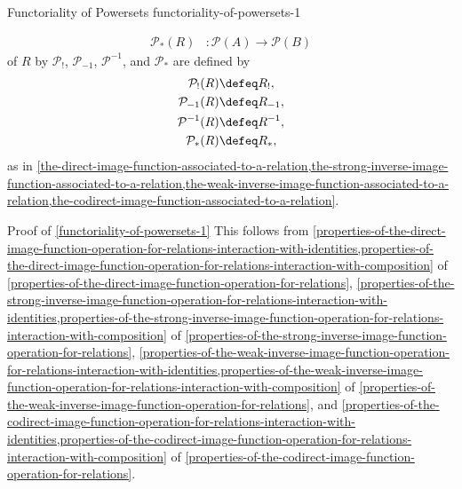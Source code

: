 \begin{proposition}{Functoriality of Powersets \rmI}{functoriality-of-powersets-1}
\begin{itemize}
\begin{align*}
                \mathcal{P}_{*}(R)  &\colon \mathcal{P}(A) \to \mathcal{P}(B)%
            \end{align*}
            of $R$ by $\mathcal{P}_{!}$, $\mathcal{P}_{-1}$, $\mathcal{P}^{-1}$, and $\mathcal{P}_{*}$ are defined by
            \begin{align*}
                \mathcal{P}_{!}(R)  &\defeq R_{!},\\%
                \mathcal{P}_{-1}(R) &\defeq R_{-1},\\%
                \mathcal{P}^{-1}(R) &\defeq R^{-1},\\%
                \mathcal{P}_{*}(R)  &\defeq R_{*},%
            \end{align*}
            as in \cref{the-direct-image-function-associated-to-a-relation,the-strong-inverse-image-function-associated-to-a-relation,the-weak-inverse-image-function-associated-to-a-relation,the-codirect-image-function-associated-to-a-relation}.
    \end{itemize}
\end{proposition}
\begin{Proof}{Proof of \cref{functoriality-of-powersets-1}}%
    This follows from \cref{properties-of-the-direct-image-function-operation-for-relations-interaction-with-identities,properties-of-the-direct-image-function-operation-for-relations-interaction-with-composition} of \cref{properties-of-the-direct-image-function-operation-for-relations}, \cref{properties-of-the-strong-inverse-image-function-operation-for-relations-interaction-with-identities,properties-of-the-strong-inverse-image-function-operation-for-relations-interaction-with-composition} of \cref{properties-of-the-strong-inverse-image-function-operation-for-relations}, \cref{properties-of-the-weak-inverse-image-function-operation-for-relations-interaction-with-identities,properties-of-the-weak-inverse-image-function-operation-for-relations-interaction-with-composition} of \cref{properties-of-the-weak-inverse-image-function-operation-for-relations}, and \cref{properties-of-the-codirect-image-function-operation-for-relations-interaction-with-identities,properties-of-the-codirect-image-function-operation-for-relations-interaction-with-composition} of \cref{properties-of-the-codirect-image-function-operation-for-relations}.
\end{Proof}
